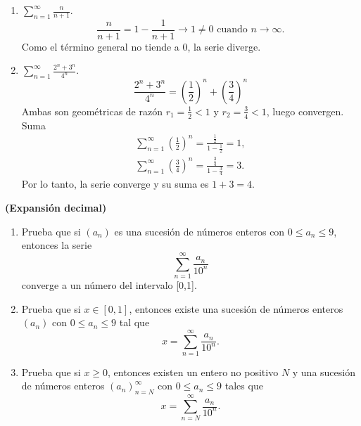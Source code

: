 \documentclass[12pt,a4paper]{article}
\newcommand{\paren}[1]{\left( #1 \right)}
\begin{document}
    \begin{solucion}
        \begin{enumerate}
            \item[(a)]  $\sum_{n=1}^{\infty}$$\frac{n}{n+1}$.
            \begin{equation*}
                \frac{n}{n+1}=1-\frac{1}{n+1}\to1\neq0\text{ cuando }n\to\infty.
            \end{equation*}
            Como el término general no tiende a 0, la serie diverge.
            \item[(b)]  $\sum_{n=1}^{\infty}\frac{2^{n}+3^{n}}{4^{n}}.$
            \begin{equation*}
                \frac{2^{n}+3^{n}}{4^{n}}=\paren{\frac{1}{2}}^{n}+\paren{\frac{3}{4}}^{n}
            \end{equation*}
            Ambas son geométricas de razón $r_{1}=\frac{1}{2}\lt1$ y $r_{2}=\frac{3}{4}\lt1$,
            luego convergen. Suma
            \begin{align*}
                \sum_{n=1}^{\infty}\paren{\frac{1}{2}}^{n}=\frac{\frac{1}{2}}{1-\frac{1}{2}}=1,\\
                \sum_{n=1}^{\infty}\paren{\frac{3}{4}}^{n}=\frac{\frac{3}{4}}{1-\frac{3}{4}}=3.
            \end{align*}
            Por lo tanto, la serie converge y su suma es $1+3=4$.
        \end{enumerate}
    \end{solucion}

    \begin{mdframed}[style=mdpinkbox,frametitle={Ejercicio 5}]
        \textbf{(Expansión decimal)}
        \begin{enumerate}
            \item[(a)] Prueba que si $(a_{n})$ es una sucesión de números enteros con $0\leq a_{n}\leq9$,
            entonces la serie
            \begin{equation*}
                \sum_{n=1}^{\infty}\frac{a_{n}}{10^{n}}
            \end{equation*}
            converge a un número del intervalo [0,1].
            \item[(b)] Prueba que si $x\in[0,1]$, entonces existe una sucesión de números enteros $(a_{n})$
            con $0\leq a_{n}\leq9$ tal que
            \begin{equation*}
                x=\sum_{n=1}^{\infty}\frac{a_{n}}{10^{n}}.
            \end{equation*}
            \item[(c)] Prueba que si $x\geq0$, entonces existen un entero no positivo $N$ y una sucesión de números
            enteros $(a_{n})_{n=N}^{\infty}$ con $0\leq a_{n}\leq9$ tales que
            \begin{equation*}
                x=\sum_{n=N}^{\infty}\frac{a_{n}}{10^{n}}.
            \end{equation*}
        \end{enumerate}
    \end{mdframed}
\end{document}
